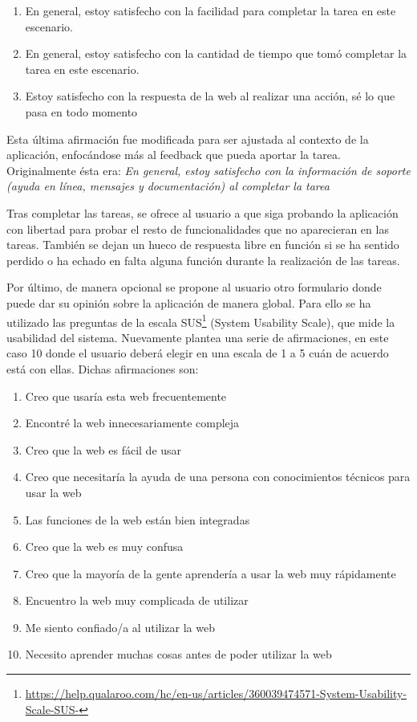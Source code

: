 \begin{enumerate}
	\item En general, estoy satisfecho con la facilidad para completar la tarea en este escenario.
	\item En general, estoy satisfecho con la cantidad de tiempo que tomó completar la tarea en este escenario.
	\item Estoy satisfecho con la respuesta de la web al realizar una acción, sé lo que pasa en todo momento
\end{enumerate}

Esta última afirmación fue modificada para ser ajustada al contexto de la aplicación, enfocándose más al feedback que pueda aportar la tarea. Originalmente ésta era:  \textit{En general, estoy satisfecho con la información de soporte (ayuda en línea, mensajes y documentación) al completar la tarea}

Tras completar las tareas, se ofrece al usuario a que siga probando la aplicación con libertad para probar el resto de funcionalidades que no aparecieran en las tareas.  
También se dejan un hueco de respuesta libre en función si se ha sentido perdido o ha echado en falta alguna función durante la realización de las tareas. 

Por último, de manera opcional se propone al usuario otro formulario donde puede dar su opinión sobre la aplicación de manera global. Para ello se ha utilizado las preguntas de la escala SUS\footnote{\url{https://help.qualaroo.com/hc/en-us/articles/360039474571-System-Usability-Scale-SUS-}} (System Usability Scale), que mide la usabilidad del sistema. Nuevamente plantea una serie de afirmaciones, en este caso 10 donde el usuario deberá elegir en una escala de 1 a 5 cuán de acuerdo está con ellas. Dichas afirmaciones son: 


\begin{enumerate}
	\item Creo que usaría esta web frecuentemente
	\item Encontré la web innecesariamente compleja
	\item Creo que la web es fácil de usar
	\item Creo que necesitaría la ayuda de una persona con conocimientos técnicos para usar la web
	\item Las funciones de la web están bien integradas
	\item Creo que la web es muy confusa
	\item Creo que la mayoría de la gente aprendería a usar la web muy rápidamente
	\item Encuentro la web muy complicada de utilizar
	\item Me siento confiado/a al utilizar la web
	\item Necesito aprender muchas cosas antes de poder utilizar la web
\end{enumerate}

